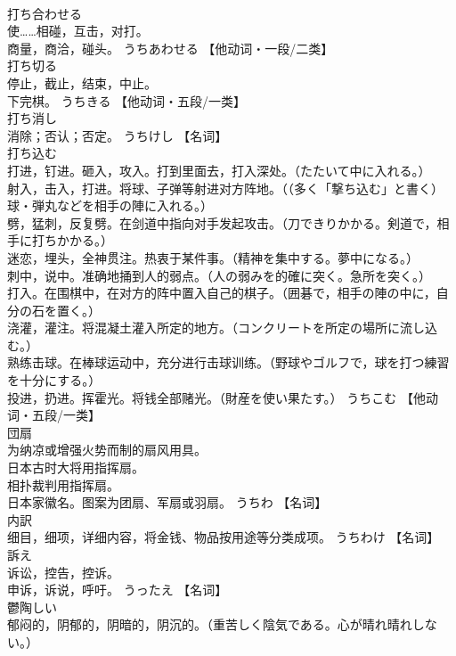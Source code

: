 \documentclass[8pt]{extreport}
\begin{document}
\begin{CJK}{UTF8}{min}
\\	打ち合わせる	
\\	使……相碰，互击，对打。 
\\	商量，商洽，碰头。	うちあわせる		【他动词・一段/二类】
\\	打ち切る	
\\	停止，截止，结束，中止。 
\\	下完棋。	うちきる		【他动词・五段/一类】
\\	打ち消し	
\\	消除；否认；否定。	うちけし		【名词】
\\	打ち込む	
\\	打进，钉进。砸入，攻入。打到里面去，打入深处。（たたいて中に入れる。） 
\\	射入，击入，打进。将球、子弹等射进对方阵地。（（多く「撃ち込む」と書く）球・弾丸などを相手の陣に入れる。） 
\\	劈，猛刺，反复劈。在剑道中指向对手发起攻击。（刀できりかかる。剣道で，相手に打ちかかる。） 
\\	迷恋，埋头，全神贯注。热衷于某件事。（精神を集中する。夢中になる。） 
\\	刺中，说中。准确地捅到人的弱点。（人の弱みを的確に突く。急所を突く。） 
\\	打入。在围棋中，在对方的阵中置入自己的棋子。（囲碁で，相手の陣の中に，自分の石を置く。） 
\\	浇灌，灌注。将混凝土灌入所定的地方。（コンクリートを所定の場所に流し込む。） 
\\	熟练击球。在棒球运动中，充分进行击球训练。（野球やゴルフで，球を打つ練習を十分にする。） 
\\	投进，扔进。挥霍光。将钱全部赌光。（財産を使い果たす。）	うちこむ		【他动词・五段/一类】
\\	団扇	
\\	为纳凉或增强火势而制的扇风用具。 
\\	日本古时大将用指挥扇。 
\\	相扑裁判用指挥扇。 
\\	日本家徽名。图案为团扇、军扇或羽扇。	うちわ		【名词】
\\	内訳	
\\	细目，细项，详细内容，将金钱、物品按用途等分类成项。	うちわけ		【名词】
\\	訴え	
\\	诉讼，控告，控诉。 
\\	申诉，诉说，呼吁。	うったえ		【名词】
\\	鬱陶しい	
\\	郁闷的，阴郁的，阴暗的，阴沉的。（重苦しく陰気である。心が晴れ晴れしない。） 

\end{CJK}
\end{document}
